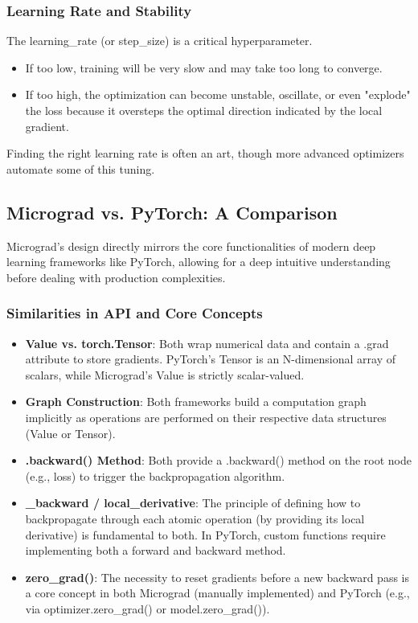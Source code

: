 \subsubsection{Learning Rate and Stability} 
The learning\_rate (or step\_size) is a critical hyperparameter. 
\begin{itemize} 
\item If too low, training will be very slow and may take too long to converge. 
\item If too high, the optimization can become unstable, oscillate, or even "explode" the loss because it oversteps the optimal direction indicated by the local gradient. 
\end{itemize} 
Finding the right learning rate is often an art, though more advanced optimizers automate some of this tuning.

\subsection{Micrograd vs. PyTorch: A Comparison}
Micrograd's design directly mirrors the core functionalities of modern deep learning frameworks like PyTorch, allowing for a deep intuitive understanding before dealing with production complexities.

\subsubsection{Similarities in API and Core Concepts} 
\begin{itemize} 
\item \textbf{Value vs. torch.Tensor}: Both wrap numerical data and contain a .grad attribute to store gradients. PyTorch's Tensor is an N-dimensional array of scalars, while Micrograd's Value is strictly scalar-valued. 
\item \textbf{Graph Construction}: Both frameworks build a computation graph implicitly as operations are performed on their respective data structures (Value or Tensor). 
\item \textbf{.backward() Method}: Both provide a .backward() method on the root node (e.g., loss) to trigger the backpropagation algorithm. 
\item \textbf{\_backward / local\_derivative}: The principle of defining how to backpropagate through each atomic operation (by providing its local derivative) is fundamental to both. In PyTorch, custom functions require implementing both a forward and backward method. 
\item \textbf{zero\_grad()}: The necessity to reset gradients before a new backward pass is a core concept in both Micrograd (manually implemented) and PyTorch (e.g., via optimizer.zero\_grad() or model.zero\_grad()). 
\end{itemize}

